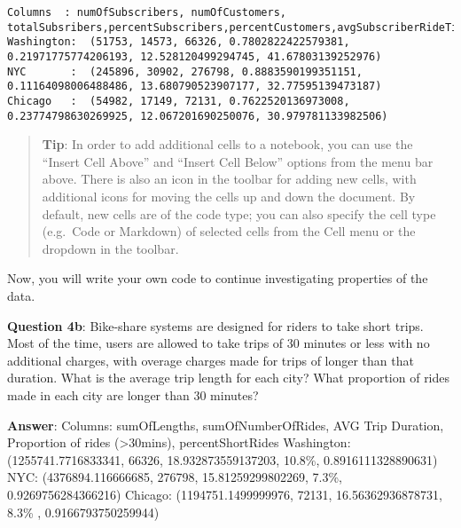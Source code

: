\documentclass[11pt]{article}
\begin{document}
    \begin{Verbatim}[commandchars=\\\{\}]
Columns  : numOfSubscribers, numOfCustomers, totalSubsribers,percentSubscribers,percentCustomers,avgSubscriberRideTime,avgSCustomerRideTime
Washington:  (51753, 14573, 66326, 0.7802822422579381, 0.21971775774206193, 12.528120499294745, 41.67803139252976)
NYC       :  (245896, 30902, 276798, 0.8883590199351151, 0.11164098006488486, 13.680790523907177, 32.77595139473187)
Chicago   :  (54982, 17149, 72131, 0.7622520136973008, 0.23774798630269925, 12.067201690250076, 30.979781133982506)

    \end{Verbatim}

    \begin{quote}
\textbf{Tip}: In order to add additional cells to a notebook, you can
use the ``Insert Cell Above'' and ``Insert Cell Below'' options from the
menu bar above. There is also an icon in the toolbar for adding new
cells, with additional icons for moving the cells up and down the
document. By default, new cells are of the code type; you can also
specify the cell type (e.g.~Code or Markdown) of selected cells from the
Cell menu or the dropdown in the toolbar.
\end{quote}

Now, you will write your own code to continue investigating properties
of the data.

\textbf{Question 4b}: Bike-share systems are designed for riders to take
short trips. Most of the time, users are allowed to take trips of 30
minutes or less with no additional charges, with overage charges made
for trips of longer than that duration. What is the average trip length
for each city? What proportion of rides made in each city are longer
than 30 minutes?

\textbf{Answer}: Columns: sumOfLengths, sumOfNumberOfRides, AVG Trip
Duration, Proportion of rides (\textgreater{}30mins), percentShortRides
Washington: (1255741.7716833341, 66326, 18.932873559137203, 10.8\%,
0.8916111328890631) NYC: (4376894.116666685, 276798, 15.81259299802269,
7.3\%, 0.9269756284366216) Chicago: (1194751.1499999976, 72131,
16.56362936878731, 8.3\% , 0.9166793750259944)
\end{document}
